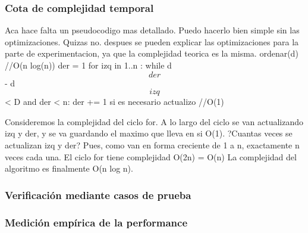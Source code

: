 \documentclass[11pt, a4paper, twoside]{article}
\begin{document}
\subsubsection{Cota de complejidad temporal}
Aca hace falta un pseudocodigo mas detallado. Puedo hacerlo bien simple sin las optimizaciones. Quizas no. despues se pueden explicar las optimizaciones para la parte de experimentacion, ya que la complejidad teorica es la misma.
ordenar(d) //O(n log(n))
der = 1
for izq in 1..n :
    while d\[der\] - d\[izq\] < D and der < n:
        der += 1
    si es necesario actualizo //O(1)

Consideremos la complejidad del ciclo for. A lo largo del ciclo se van actualizando izq y der, y se va guardando el maximo que lleva  en si O(1).
?Cuantas veces se actualizan izq y der? Pues, como van en forma creciente de 1 a n, exactamente n veces cada una. El ciclo for tiene complejidad O(2n) = O(n)
La complejidad del algoritmo es finalmente O(n log n).

\subsubsection{Verificación mediante casos de prueba}

\subsubsection{Medición empírica de la performance}

\end{document}
